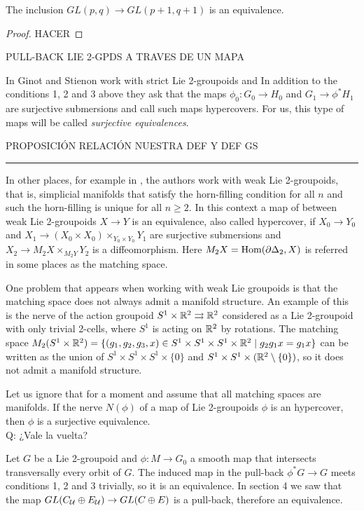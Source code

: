 \begin{lemma}
The inclusion $GL(p,q) \to GL(p+1,q+1)$ is an equivalence.
\end{lemma}

\begin{proof}
HACER
\end{proof}

\bigskip

\noi PULL-BACK LIE 2-GPDS A TRAVES DE UN MAPA

\bigskip

In \cite{gs15} Ginot and Stienon work with strict Lie 2-groupoids and In addition to the conditions 1, 2 and 3 above they ask that the maps $\phi_0: G_0\to H_0$ and $G_1 \to \phi^*H_1$ are surjective submersions and call such maps hypercovers.
For us, this type of maps will be called \emph{surjective equivalences}.


\bigskip

\noi PROPOSICIÓN RELACIÓN NUESTRA DEF Y DEF GS

\bigskip

\noindent\rule{\textwidth}{5pt}

In other places, for example in \cite{zhu09}, the authors work with weak Lie 2-groupoids, that is, simplicial manifolds that satisfy the horn-filling condition for all $n$ and such the horn-filling is unique for all $n\geq 2$.
In this context a map of between weak Lie 2-groupoids $X\to Y$ is an equivalence, also called hypercover, if $X_0\to Y_0$ and $X_1\to (X_0\times X_0)\times_{Y_0\times Y_0} Y_1$ are surjective submersions and $X_2\to M_2X\times_{M_2Y} Y_2$ is a diffeomorphism.
Here $M_2X = \operatorname{Hom}(\partial\Delta_2, X)$ is referred in some places as the matching space.

One problem that appears when working with weak Lie groupoids is that the matching space does not always admit a manifold structure.
An example of this is the nerve of the action groupoid $S^1\times\mathbb{R}^2 \rightrightarrows \mathbb{R}^2$ considered as a Lie 2-groupoid with only trivial 2-cells, where $S^1$ is acting on $\mathbb{R}^2$ by rotations.
The matching space
$ M_2(S^1\times\mathbb{R}^2) = \{ (g_1,g_2,g_3,x)\in S^1\times S^1\times S^1\times\mathbb{R}^2 \mid g_2g_1 x = g_1 x \} $
can be written as the union of $S^1\times S^1\times S^1\times \{0\}$ and $S^1\times S^1\times (\mathbb{R}^2\setminus \{0\})$, so it does not admit a manifold structure.

Let us ignore that for a moment and assume that all matching spaces are manifolds.
If the nerve $N(\phi)$ of a map of Lie 2-groupoids $\phi$ is an hypercover, then $\phi$ is a surjective equivalence.\\
Q: ¿Vale la vuelta?

\medskip

Let $G$ be a Lie 2-groupoid and $\phi: M\to G_0$ a smooth map that intersects transversally every orbit of $G$.
The induced map in the pull-back $\phi^*G \to G$ meets conditions 1, 2 and 3 trivially, so it is an equivalence.
In section 4 we saw that the map $GL(C_{\mathcal{U}}\oplus E_{\mathcal{U}}) \to GL(C\oplus E)$ is a pull-back, therefore an equivalence.

